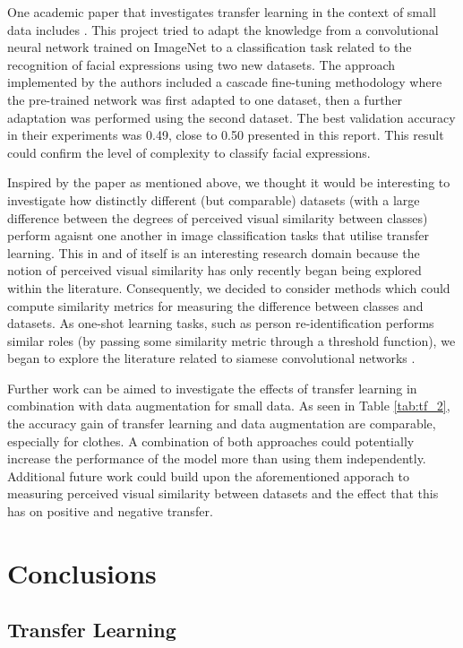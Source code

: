 \documentclass{article}
\begin{document}
One academic paper that investigates transfer learning in the context of small data includes \citep{ng2015deep}. This project tried to adapt the knowledge from a convolutional neural network trained on ImageNet to a classification task related to the recognition of facial expressions using two new datasets. The approach implemented by the authors included a cascade fine-tuning methodology where the pre-trained network was first adapted to one dataset, then a further adaptation was performed using the second dataset. The best validation accuracy in their experiments was 0.49, close to 0.50 presented in this report. This result could confirm the level of complexity to classify facial expressions.

Inspired by the paper as mentioned above, we thought it would be interesting to investigate how distinctly different (but comparable) datasets (with a large difference between the degrees of perceived visual similarity between classes) perform agaisnt one another in image classification tasks that utilise transfer learning. This in and of itself is an interesting research domain because the notion of perceived visual similarity has only recently began being explored within the literature. Consequently, we decided to consider methods which could compute similarity metrics for measuring the difference between classes and datasets. As one-shot learning tasks, such as person re-identification \cite{ahmed2015improved} performs similar roles (by passing some similarity metric through a threshold function), we began to explore the literature related to siamese convolutional networks \cite{koch}.

Further work can be aimed to investigate the effects of transfer learning in combination with data augmentation for small data. As seen in Table \ref{tab:tf_2}, the accuracy gain of transfer learning and data augmentation are comparable, especially for clothes. A combination of both approaches could potentially increase the performance of the model more than using them independently. Additional future work could build upon the aforementioned apporach to measuring perceived visual similarity between datasets and the effect that this has on positive and negative transfer.

\section{Conclusions}
\label{sec:conclusions}

\subsection{Transfer Learning}
\end{document}
